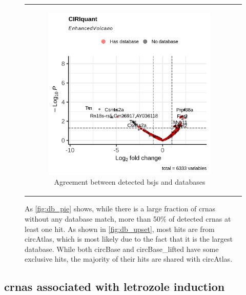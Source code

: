 \begin{figure}[ht]
\begin{tabular}{cc}
\begin{subfigure}{0.5\textwidth}
            \includegraphics[width=\linewidth]{chapters/4_results_and_discussion/figures/dea/ciriquant/tamoxifen/volcano.png}
            \caption{Agreement between detected
                \glspl{bsj} and databases}
            \label{fig:tamoxifen_volcano_ciriquant}
        \end{subfigure} &

    \end{tabular}
    \caption{As \cref{fig:db_pie} shows, while there is a large fraction of
        \glspl{crna} without any
        database match, more than 50\% of detected \glspl{crna} at least one
        hit.
        As shown in \cref{fig:db_upset}, most hits are from circAtlas, which is most
        likely due to the fact that it is the largest database.
        While both circBase and circBase\_lifted have some exclusive hits, the majority
        of their hits are shared with circAtlas.
    }
    \label{fig:tamoxifen_volcano}
\end{figure}

\subsection{\Glspl{crna} associated with letrozole induction}

